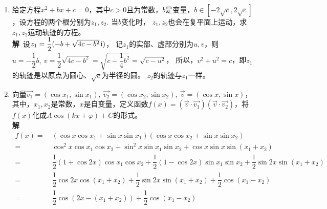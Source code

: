\begin{enumerate}[label={【\textbf{例\thechapter.\arabic*}】},
 leftmargin=\inteval{\myenumleftmargin}pt,
 itemsep=\inteval{\myenumitempsep}pt,
 itemindent=\inteval{\myenumitemindent}pt]
\begin{align*}
    \begin{cases}
        a^2+b^2=1 & \mycircled{1}\\ 
        c^2+d^2=1 & \mycircled{2}\\
        a+c=\dfrac{1}{2} &\mycircled{3}\\ 
        b+d=\dfrac{\sqrt{3}}{2} & \mycircled{4}
    \end{cases}
\end{align*}
用$ - $可得：
\begin{align*}
    a^2-c^2 &=d^2-b^2 \\
    (a-c)\underbrace{(a+c)}_{\frac{1}{2}} &
    =(d-b)\underbrace{(d+b)}_{\frac{\sqrt{3}}{2}}   \\
    a-c&=\sqrt{3}(d-b)\q \mycircled{5}
\end{align*}
又由,可得：
\begin{align*}
    a+c=\dfrac{\sqrt{3}}{3}(d+b)\q \mycircled{6}
\end{align*} 
由,解得$ a=\dfrac{\sqrt{3}}{3}(2d-b) $，
代入可得：$ \dfrac{4}{3}(b^2-bd+d^2)=1 $. 另外，
$ (b+d)^2=b^2+2bd+d^2=\dfrac{3}{4} $，于是得到$ bd=0 $，
与联立可解得$ b=0,\ \dfrac{\sqrt{3}}{2} $.余下省略。

\item 给定方程$ x^2+bx+c=0 $，其中$ c>0 $且为常数，$ b $是变量，$ b\in [-2\sqrt{c},
2\sqrt{c}] $，设方程的两个根分别为$ z_1,z_2 $. 当$ b $变化时，
$ z_1,z_2 $也会在复平面上运动，求$ z_1,z_2 $运动轨迹的方程。\\
\textbf{解}\ 设$ z_1=\dfrac{1}{2}(-b+\sqrt{4c-b^2}\, \mathrm{i}) $，
记$ z_1 $的实部、虚部分别为$ u,v $，则$ u=-\dfrac{1}{2}b,\ 
v=\dfrac{1}{2}\sqrt{4c-b^2}=\sqrt{c-\dfrac{1}{4}b^2}=\sqrt{c-u^2} $，
所以，$ v^2+u^2=c $，即$ z_1 $的轨迹是以原点为圆心、$ \sqrt{c} $为半径的圆。
$ z_2 $的轨迹与$ z_1 $一样。

\item 向量$ \vec{v_1}=(\cos x_1,\sin x_1),\ \vec{v_2}=
(\cos x_2,\sin x_2),\ \vec{v}=(\cos x,\sin x) $，
其中，$  x_1, x_2 $是常数，$ x $是自变量，定义函数$ f(x)=
(\vec{v}\cdot \vec{v_1})(\vec{v}\cdot
\vec{v_2}) $，将$ f( x) $化成$ A\cos(k x+\varphi)+C $的形式。\\
\textbf{解}\ 
\begin{align*}
    f(x)=&\ (\cos x\cos x_1+\sin x\sin x_1)(\cos x\cos x_2+\sin x\sin x_2) \\
    =&\ \cos^2x\cos x_1\cos x_2+\sin^2x\sin x_1\sin x_2+\cos x\sin x\sin(x_1+x_2) \\
    =&\ \dfrac{1}{2}(1+\cos2x)\cos x_1\cos x_2+\dfrac{1}{2}(1-\cos2x)\sin x_1\sin x_2
    +\dfrac{1}{2}\sin2x\sin(x_1+x_2) \\
    =&\  \dfrac{1}{2}\cos2x\cos(x_1+x_2)+\dfrac{1}{2}\sin2x\sin(x_1+x_2)
    +\dfrac{1}{2}\cos(x_1-x_2) \\
    =&\  \dfrac{1}{2}\cos(2x-(x_1+x_2))+\dfrac{1}{2}\cos(x_1-x_2)
\end{align*}


\end{enumerate}
